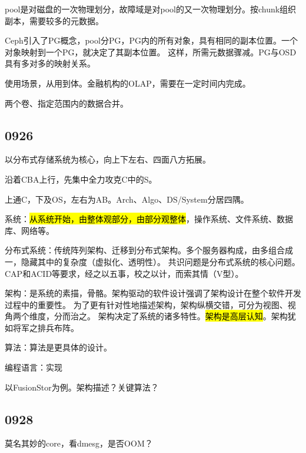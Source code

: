 pool是对磁盘的一次物理划分，故障域是对pool的又一次物理划分。按chunk组织副本，需要较多的元数据。

Ceph引入了PG概念，pool分PG，PG内的所有对象，具有相同的副本位置。一个对象映射到一个PG，就决定了其副本位置。
这样，所需元数据骤减。PG与OSD具有多对多的映射关系。

使用场景，从用到体。金融机构的OLAP，需要在一定时间内完成。

两个卷、指定范围内的数据合并。

\subsection{0926}

以分布式存储系统为核心，向上下左右、四面八方拓展。

沿着CBA上行，先集中全力攻克C中的S。

上通C，下及OS，左右为AB。Arch、Algo、DS/System分居四隅。

系统：\hl{从系统开始，由整体观部分，由部分观整体}，操作系统、文件系统、数据库、网络等。

分布式系统：传统阵列架构、迁移到分布式架构。多个服务器构成，由多组合成一，隐藏其中的复杂度（虚拟化、透明性）。
共识问题是分布式系统的核心问题。CAP和ACID等要求，经之以五事，校之以计，而索其情（V型）。

架构：是系统的素描，骨骼。架构驱动的软件设计强调了架构设计在整个软件开发过程中的重要性。
为了更有针对性地描述架构，架构纵横交错，可分为视图、视角两个维度，分而治之。
架构决定了系统的诸多特性。\hl{架构是高层认知}。架构犹如将军之排兵布阵。

算法：算法是更具体的设计。

编程语言：实现

以FusionStor为例。架构描述？关键算法？

\subsection{0928}

莫名其妙的core，看dmesg，是否OOM？

